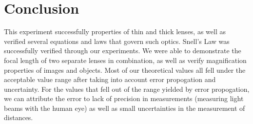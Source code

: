 \documentclass{article}
\begin{document}
\section{Conclusion}
This experiment successfully properties of thin and thick lenses, as well as
verified several equations and laws that govern such optics. Snell's Law was
successfully verified through our experiments. We were able to demonstrate the
focal length of two separate lenses in combination, as well as verify
magnification properties of images and objects. Most of our theoretical values
all fell under the acceptable value range after taking into account error
propogation and uncertainty. For the values that fell out of the range yielded
by error propogation, we can attribute the error to lack of precision in
measurements (measuring light beams with the human eye) as well as small
uncertainties in the measurement of distances. 
\end{document}
